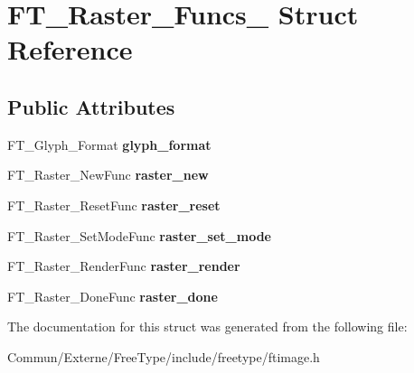 \hypertarget{struct_f_t___raster___funcs__}{}\section{F\+T\+\_\+\+Raster\+\_\+\+Funcs\+\_\+ Struct Reference}
\label{struct_f_t___raster___funcs__}
\subsection*{Public Attributes}
\begin{DoxyCompactItemize}
\item 
F\+T\+\_\+\+Glyph\+\_\+\+Format {\bfseries glyph\+\_\+format}\hypertarget{struct_f_t___raster___funcs___a741b43afa16f1f1b7f633cebd9f1d6a9}{}\label{struct_f_t___raster___funcs___a741b43afa16f1f1b7f633cebd9f1d6a9}

\item 
F\+T\+\_\+\+Raster\+\_\+\+New\+Func {\bfseries raster\+\_\+new}\hypertarget{struct_f_t___raster___funcs___a31c9df9af6636df8a17a11bcd921b6a4}{}\label{struct_f_t___raster___funcs___a31c9df9af6636df8a17a11bcd921b6a4}

\item 
F\+T\+\_\+\+Raster\+\_\+\+Reset\+Func {\bfseries raster\+\_\+reset}\hypertarget{struct_f_t___raster___funcs___a91e9decd6066090a5f306f33f9815d39}{}\label{struct_f_t___raster___funcs___a91e9decd6066090a5f306f33f9815d39}

\item 
F\+T\+\_\+\+Raster\+\_\+\+Set\+Mode\+Func {\bfseries raster\+\_\+set\+\_\+mode}\hypertarget{struct_f_t___raster___funcs___a3b37c781e54cf933cb60f57f2d45b32c}{}\label{struct_f_t___raster___funcs___a3b37c781e54cf933cb60f57f2d45b32c}

\item 
F\+T\+\_\+\+Raster\+\_\+\+Render\+Func {\bfseries raster\+\_\+render}\hypertarget{struct_f_t___raster___funcs___a7479a3def4522ce2667d6772e7bb96a5}{}\label{struct_f_t___raster___funcs___a7479a3def4522ce2667d6772e7bb96a5}

\item 
F\+T\+\_\+\+Raster\+\_\+\+Done\+Func {\bfseries raster\+\_\+done}\hypertarget{struct_f_t___raster___funcs___aecfd50bb6567d4442c997467cd68c857}{}\label{struct_f_t___raster___funcs___aecfd50bb6567d4442c997467cd68c857}

\end{DoxyCompactItemize}


The documentation for this struct was generated from the following file\+:\begin{DoxyCompactItemize}
\item 
Commun/\+Externe/\+Free\+Type/include/freetype/ftimage.\+h\end{DoxyCompactItemize}

